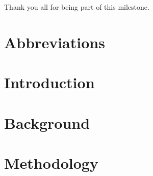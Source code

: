 Thank you all for being part of this milestone.



\clearpage
\thispagestyle{empty}
\null
\clearpage
\tableofcontents
\cleardoublepage

\listoffigures
\cleardoublepage

\listoftables
\cleardoublepage

\cleardoublepage
\chapter*{Abbreviations}

\cleardoublepage

\renewcommand{\nomname}{List of Symbols}

\printnomenclature
\cleardoublepage


\cleardoublepage
\ifodd\value{page}\null\thispagestyle{empty}\newpage\fi

\chapter{Introduction} \label{Introduction}


\cleardoublepage
\ifodd\value{page}\null\thispagestyle{empty}\newpage\fi
\chapter{Background} \label{Background}


\cleardoublepage
\chapter{Methodology} \label{Methodology}


